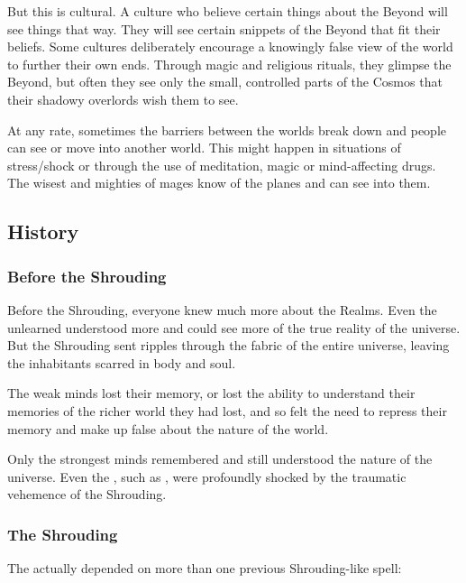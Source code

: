 But this is cultural. A culture who believe certain things about the Beyond will see things that way. They will see certain snippets of the Beyond that fit their beliefs. Some cultures deliberately encourage a knowingly false view of the world to further their own ends. Through magic and religious rituals, they glimpse the Beyond, but often they see only the small, controlled parts of the Cosmos that their shadowy overlords wish them to see. 

At any rate, sometimes the barriers between the worlds break down and people can see or move into another world. This might happen in situations of stress/shock or through the use of meditation, magic or mind-affecting drugs. The wisest and mighties of mages know of the planes and can see into them. 







\subsection{History}





\subsubsection{Before the Shrouding}
Before the Shrouding, everyone knew much more about the Realms. Even the unlearned understood more and could see more of the true reality of the universe. But the Shrouding sent ripples through the fabric of the entire universe, leaving the inhabitants scarred in body and soul. 

The weak minds lost their memory, or lost the ability to understand their memories of the richer world they had lost, and so felt the need to repress their memory and make up false  about the nature of the world. 

Only the strongest minds remembered and still understood the nature of the universe. Even the \vertices, such as \Ishnaruchaefir, were profoundly shocked by the traumatic vehemence of the Shrouding. 





\subsubsection{The Shrouding}
The \Shrouding{} actually depended on more than one previous Shrouding-like spell: 

